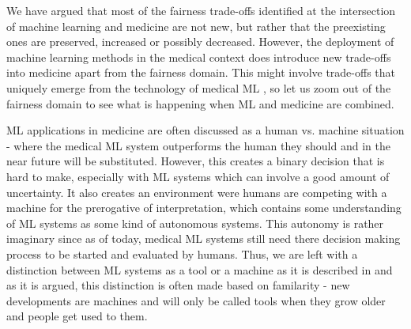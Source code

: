 
We have argued that most of the fairness trade-offs identified at the intersection of machine learning and medicine are not new, but rather that the preexisting ones are preserved, increased or possibly decreased. However, the deployment of machine learning methods in the medical context does introduce new trade-offs into medicine apart from the fairness domain. This might involve trade-offs that uniquely emerge from the technology of medical ML \cite{Dijkstra2020}, so let us zoom out of the fairness domain to see what is happening when ML and medicine are combined. 

ML applications in medicine are often discussed as a human vs. machine situation - where the medical ML system outperforms the human they should and in the near future will be substituted. However, this creates a binary decision that is hard to make, especially with ML systems which can involve a good amount of uncertainty. It also creates an environment were humans are competing with a machine for the prerogative of interpretation, which contains some understanding of ML systems as some kind of autonomous systems. This autonomy is rather imaginary since as of today, medical ML systems still need there decision making process to be started and evaluated by humans. Thus, we are left with a distinction between ML systems as a tool or a machine as it is described in \citet{Williamson2021} and as it is argued, this distinction is often made based on familarity - new developments are machines and will only be called tools when they grow older and people get used to them. 

